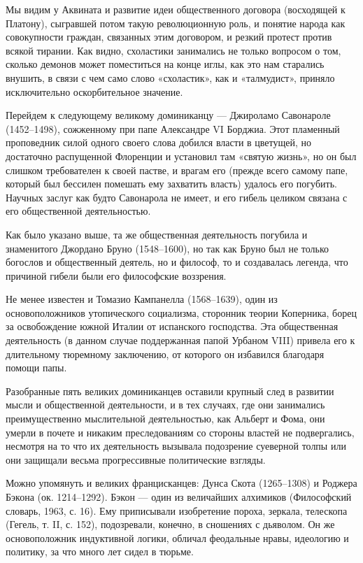 Мы видим у Аквината и развитие идеи общественного договора (восходящей
к Платону), сыгравшей потом такую революционную роль, и понятие народа
как совокупности  граждан, связанных этим договором,  и резкий протест
против  всякой тирании.  Как  видно, схоластики  занимались не  только
вопросом о том,  сколько демонов может поместиться на  конце иглы, как
это нам старались внушить, в связи с чем само слово «схоластик», как и
«талмудист», приняло исключительно оскорбительное значение.

Перейдем к  следующему великому  доминиканцу ---  Джироламо Савонароле
(1452--1498),  сожженному   при  папе  Александре  VI   Борджиа.  Этот
пламенный  проповедник  силой одного  своего  слова  добился власти  в
цветущей, но достаточно распущенной  Флоренции и установил там «святую
жизнь», но  он был слишком требователен  к своей пастве, и  врагам его
(прежде всего самому папе, который был бессилен помешать ему захватить
власть) удалось его  погубить. Научных заслуг как  будто Савонарола не
имеет, и его гибель целиком связана с его общественной деятельностью.

Как  было указано  выше, та  же общественная  деятельность погубила  и
знаменитого  Джордано Бруно  (1548--1600),  но так  как  Бруно был  не
только богослов и общественный деятель, но и философ, то и создавалась
легенда, что причиной гибели были его философские воззрения.

Не  менее   известен  и  Томазио  Кампанелла   (1568--1639),  один  из
основоположников утопического социализма,  сторонник теории Коперника,
борец  за  освобождение южной  Италии  от  испанского господства.  Эта
общественная деятельность (в данном  случае поддержанная папой Урбаном
VIII) привела его  к длительному тюремному заключению,  от которого он
избавился благодаря помощи папы.

Разобранные пять великих доминиканцев оставили крупный след в развитии
мысли и общественной деятельности, и в тех случаях, где они занимались
преимущественно мыслительной  деятельностью, как  Альберт и  Фома, они
умерли  в  почете  и  никаким преследованиям  со  стороны  властей  не
подвергались, несмотря  на то что их  деятельность вызывала подозрение
суеверной  толпы или  они защищали  весьма прогрессивные  политические
взгляды.

Можно  упомянуть и  великих  францисканцев:  Дунса Скота  (1265--1308)
и  Роджера  Бэкона (ок.  1214--1292).  Бэкон  --- один  из  величайших
алхимиков  (Философский   словарь,  1963,  с.  16).   Ему  приписывали
изобретение  пороха,  зеркала,  телескопа  (Гегель, т.  II,  с.  152),
подозревали,  конечно, в  сношениях с  дьяволом. Он  же основоположник
индуктивной логики, обличал феодальные нравы, идеологию и политику, за
что много лет сидел в тюрьме.

